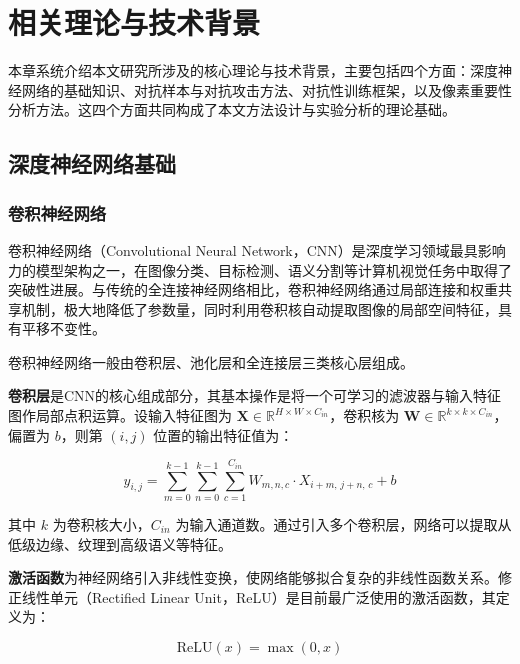 
\chapter{相关理论与技术背景} \label{chpt:background}

本章系统介绍本文研究所涉及的核心理论与技术背景，主要包括四个方面：深度神经网络的基础知识、对抗样本与对抗攻击方法、对抗性训练框架，以及像素重要性分析方法。这四个方面共同构成了本文方法设计与实验分析的理论基础。

\section{深度神经网络基础}

\subsection{卷积神经网络}

卷积神经网络（Convolutional Neural Network，CNN）是深度学习领域最具影响力的模型架构之一，在图像分类、目标检测、语义分割等计算机视觉任务中取得了突破性进展\cite{lecun2015deeplearning,krizhevsky2012imagenet}。与传统的全连接神经网络相比，卷积神经网络通过局部连接和权重共享机制，极大地降低了参数量，同时利用卷积核自动提取图像的局部空间特征，具有平移不变性。

卷积神经网络一般由卷积层、池化层和全连接层三类核心层组成。

\textbf{卷积层}是CNN的核心组成部分，其基本操作是将一个可学习的滤波器与输入特征图作局部点积运算。设输入特征图为 $\mathbf{X} \in \mathbb{R}^{H \times W \times C_{in}}$，卷积核为 $\mathbf{W} \in \mathbb{R}^{k \times k \times C_{in}}$，偏置为 $b$，则第 $(i, j)$ 位置的输出特征值为：

\begin{equation}
  y_{i,j} = \sum_{m=0}^{k-1} \sum_{n=0}^{k-1} \sum_{c=1}^{C_{in}} W_{m,n,c} \cdot X_{i+m,\, j+n,\, c} + b
\end{equation}

其中 $k$ 为卷积核大小，$C_{in}$ 为输入通道数。通过引入多个卷积层，网络可以提取从低级边缘、纹理到高级语义等特征。

\textbf{激活函数}为神经网络引入非线性变换，使网络能够拟合复杂的非线性函数关系。修正线性单元（Rectified Linear Unit，ReLU）是目前最广泛使用的激活函数，其定义为：

\begin{equation}
  \text{ReLU}(x) = \max(0, x)
\end{equation}

